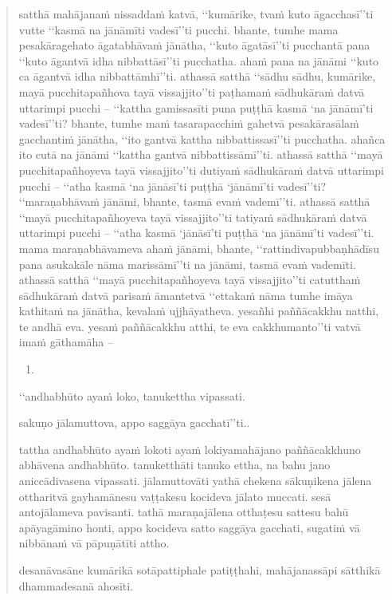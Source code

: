 \documentclass[11pt,oneside]{memoir}
\begin{document}
\begin{quote}
satthā mahājanaṁ nissaddaṁ katvā, ‘‘kumārike, tvaṁ kuto āgacchasī’’ti vutte ‘‘kasmā na jānāmīti vadesī’’ti pucchi. bhante, tumhe mama pesakāragehato āgatabhāvaṁ jānātha, ‘‘kuto āgatāsī’’ti pucchantā pana ‘‘kuto āgantvā idha nibbattāsī’’ti pucchatha. ahaṁ pana na jānāmi ‘‘kuto ca āgantvā idha nibbattāmhī’’ti. athassā satthā ‘‘sādhu sādhu, kumārike, mayā pucchitapañhova tayā vissajjito’’ti paṭhamaṁ sādhukāraṁ datvā uttarimpi pucchi – ‘‘kattha gamissasīti puna puṭṭhā kasmā ‘na jānāmī’ti vadesī’’ti? bhante, tumhe maṁ tasarapacchiṁ gahetvā pesakārasālaṁ gacchantiṁ jānātha, ‘‘ito gantvā kattha nibbattissasī’’ti pucchatha. ahañca ito cutā na jānāmi ‘‘kattha gantvā nibbattissāmī’’ti. athassā satthā ‘‘mayā pucchitapañhoyeva tayā vissajjito’’ti dutiyaṁ sādhukāraṁ datvā uttarimpi pucchi – ‘‘atha kasmā ‘na jānāsī’ti puṭṭhā ‘jānāmī’ti vadesī’’ti? ‘‘maraṇabhāvaṁ jānāmi, bhante, tasmā evaṁ vademī’’ti. athassā satthā ‘‘mayā pucchitapañhoyeva tayā vissajjito’’ti tatiyaṁ sādhukāraṁ datvā uttarimpi pucchi – ‘‘atha kasmā ‘jānāsī’ti puṭṭhā ‘na jānāmī’ti vadesī’’ti. mama maraṇabhāvameva ahaṁ jānāmi, bhante, ‘‘rattindivapubbaṇhādīsu pana asukakāle nāma marissāmī’’ti na jānāmi, tasmā evaṁ vademīti. athassā satthā ‘‘mayā pucchitapañhoyeva tayā vissajjito’’ti catutthaṁ sādhukāraṁ datvā parisaṁ āmantetvā ‘‘ettakaṁ nāma tumhe imāya kathitaṁ na jānātha, kevalaṁ ujjhāyatheva. yesañhi paññācakkhu natthi, te andhā eva. yesaṁ paññācakkhu atthi, te eva cakkhumanto’’ti vatvā imaṁ gāthamāha –

\begin{enumerate}
\item 
\end{enumerate}

‘‘andhabhūto ayaṁ loko, tanukettha vipassati.

sakuṇo jālamuttova, appo saggāya gacchatī’’ti..

tattha andhabhūto ayaṁ lokoti ayaṁ lokiyamahājano paññācakkhuno abhāvena andhabhūto. tanuketthāti tanuko ettha, na bahu jano aniccādivasena vipassati. jālamuttovāti yathā chekena sākuṇikena jālena ottharitvā gayhamānesu vaṭṭakesu kocideva jālato muccati. sesā antojālameva pavisanti. tathā maraṇajālena otthaṭesu sattesu bahū apāyagāmino honti, appo kocideva satto saggāya gacchati, sugatiṁ vā nibbānaṁ vā pāpuṇātīti attho.

desanāvasāne kumārikā sotāpattiphale patiṭṭhahi, mahājanassāpi sātthikā dhammadesanā ahosīti.


\end{quote}
\end{document}
